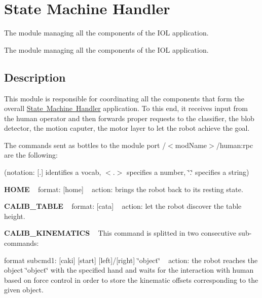 \section{State Machine Handler}
\label{group__icub__iolStateMachineHandler}


The module managing all the components of the I\+OL application.  


The module managing all the components of the I\+OL application. 

\hypertarget{group__iolReachingCalibration_intro_sec}{}\subsection{Description}\label{group__iolReachingCalibration_intro_sec}
This module is responsible for coordinating all the components that form the overall \mbox{\hyperlink{group__icub__iolStateMachineHandler}{State Machine Handler}} application. To this end, it receives input from the human operator and then forwards proper requests to the classifier, the blob detector, the motion caputer, the motor layer to let the robot achieve the goal.

The commands sent as bottles to the module port /$<$mod\+Name$>$/human\+:rpc are the following\+:

(notation\+: \mbox{[}.\mbox{]} identifies a vocab, $<$.$>$ specifies a number, \char`\"{}.\char`\"{} specifies a string)

{\bfseries{H\+O\+ME}} ~\newline
format\+: \mbox{[}home\mbox{]} ~\newline
action\+: brings the robot back to its resting state.

{\bfseries{C\+A\+L\+I\+B\+\_\+\+T\+A\+B\+LE}} ~\newline
format\+: \mbox{[}cata\mbox{]} ~\newline
action\+: let the robot discover the table height.

{\bfseries{C\+A\+L\+I\+B\+\_\+\+K\+I\+N\+E\+M\+A\+T\+I\+CS}} ~\newline
This command is splitted in two consecutive sub-\/commands\+:

format subcmd1\+: \mbox{[}caki\mbox{]} \mbox{[}start\mbox{]} \mbox{[}left\mbox{]}/\mbox{[}right\mbox{]} \char`\"{}object\char`\"{} ~\newline
action\+: the robot reaches the object \char`\"{}object\char`\"{} with the specified hand and waits for the interaction with human based on force control in order to store the kinematic offsets corresponding to the given object.

